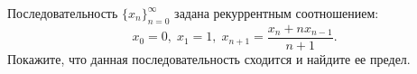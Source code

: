 \documentclass{article}
\begin{document}
Последовательность $\{x_n\}_{n=0}^\infty$ задана рекуррентным соотношением:
$$x_0=0,\; x_1=1,\; x_{n+1}=\frac{x_n + nx_{n-1}}{n+1}.$$
Покажите, что данная последовательность сходится и найдите ее предел.
\end{document}
